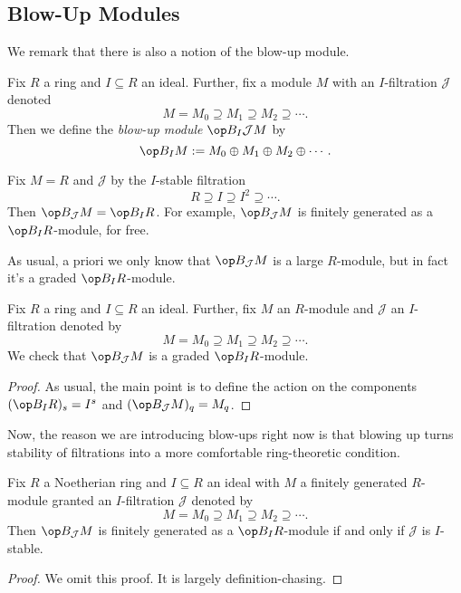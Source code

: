 \subsection{Blow-Up Modules}
We remark that there is also a notion of the blow-up module.
\begin{definition}
	Fix $R$ a ring and $I\subseteq R$ an ideal. Further, fix a module $M$ with an $I$-filtration $\mathcal J$ denoted
	\[M=M_0\supseteq M_1\supseteq M_2\supseteq\cdots.\]
	Then we define the \textit{blow-up module} $\op B_I\mathcal JM$ by
	\[\op B_IM:=M_0\oplus M_1\oplus M_2\oplus\cdots.\]
\end{definition}
\begin{example}
	Fix $M=R$ and $\mathcal J$ by the $I$-stable filtration
	\[R\supseteq I\supseteq I^2\supseteq\cdots.\]
	Then $\op B_\mathcal JM=\op B_IR$. For example, $\op B_\mathcal JM$ is finitely generated as a $\op B_IR$-module, for free.
\end{example}
As usual, a priori we only know that $\op B_\mathcal JM$ is a large $R$-module, but in fact it's a graded $\op B_IR$-module.
\begin{lemma}
	Fix $R$ a ring and $I\subseteq R$ an ideal. Further, fix $M$ an $R$-module and $\mathcal J$ an $I$-filtration denoted by
	\[M=M_0\supseteq M_1\supseteq M_2\supseteq\cdots.\]
	We check that $\op B_\mathcal JM$ is a graded $\op B_IR$-module.
\end{lemma}
\begin{proof}
	As usual, the main point is to define the action on the components $(\op B_IR)_s=I^s$ and $(\op B_\mathcal JM)_q=M_q$.
\end{proof}
Now, the reason we are introducing blow-ups right now is that blowing up turns stability of filtrations into a more comfortable ring-theoretic condition.
\begin{proposition}
	Fix $R$ a Noetherian ring and $I\subseteq R$ an ideal with $M$ a finitely generated $R$-module granted an $I$-filtration $\mathcal J$ denoted by
	\[M=M_0\supseteq M_1\supseteq M_2\supseteq\cdots.\]
	Then $\op B_\mathcal JM$ is finitely generated as a $\op B_IR$-module if and only if $\mathcal J$ is $I$-stable.
\end{proposition}
\begin{proof}
	We omit this proof. It is largely definition-chasing.
\end{proof}

